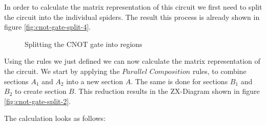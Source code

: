 In order to calculate the matrix representation of this circuit we first need to split the circuit into the individual spiders. The result this process is already shown in figure \ref{fig:cnot-gate-split-4}.

\begin{figure}[h]
    \centering
    \qquad
    \caption{Splitting the CNOT gate into regions}
    \label{fig:cnot-gate-split}
\end{figure}

Using the rules we just defined we can now calculate the matrix representation of the circuit. We start by applying the $\textit{Parallel Composition}$ rules, to combine sections $A_1$ and $A_2$ into a new section $A$. The same is done for sections $B_1$ and $B_2$ to create section $B$. This reduction results in the ZX-Diagram shown in figure \ref{fig:cnot-gate-split-2}.


The calculation looks as follows:


